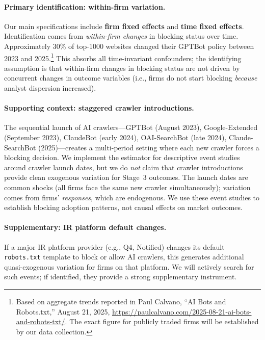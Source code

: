 \documentclass[12pt,a4paper]{article}
\begin{document}
\paragraph{Primary identification: within-firm variation.} Our main specifications include \textbf{firm fixed effects} and \textbf{time fixed effects}. Identification comes from \emph{within-firm changes} in blocking status over time. Approximately 30\% of top-1000 websites changed their GPTBot policy between 2023 and 2025.\footnote{Based on aggregate trends reported in Paul Calvano, ``AI Bots and Robots.txt,'' August 21, 2025, \url{https://paulcalvano.com/2025-08-21-ai-bots-and-robots-txt/}. The exact figure for publicly traded firms will be established by our data collection.} This absorbs all time-invariant confounders; the identifying assumption is that within-firm changes in blocking status are not driven by concurrent changes in outcome variables (i.e., firms do not start blocking \emph{because} analyst dispersion increased).

\paragraph{Supporting context: staggered crawler introductions.} The sequential launch of AI crawlers---GPTBot (August 2023), Google-Extended (September 2023), ClaudeBot (early 2024), OAI-SearchBot (late 2024), Claude-SearchBot (2025)---creates a multi-period setting where each new crawler forces a blocking decision. We implement the \citet{CallawayS2021} estimator for descriptive event studies around crawler launch dates, but we do \emph{not} claim that crawler introductions provide clean exogenous variation for Stage~3 outcomes. The launch dates are common shocks (all firms face the same new crawler simultaneously); variation comes from firms' \emph{responses}, which are endogenous. We use these event studies to establish blocking adoption patterns, not causal effects on market outcomes.

\paragraph{Supplementary: IR platform default changes.} If a major IR platform provider (e.g., Q4, Notified) changes its default \texttt{robots.txt} template to block or allow AI crawlers, this generates additional quasi-exogenous variation for firms on that platform. We will actively search for such events; if identified, they provide a strong supplementary instrument.
\end{document}
